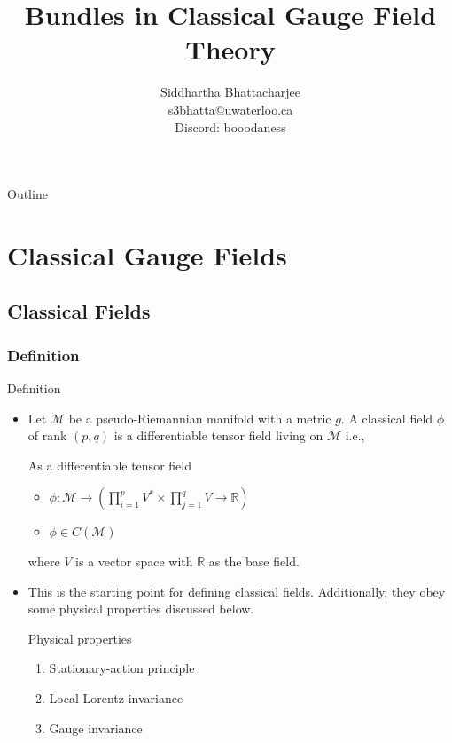 \documentclass[9pt,handout]{beamer}
\title[\textbf{Bundles in Classical Gauge Field Theory}]{Bundles in Classical Gauge Field Theory}
\author[\textbf{Sid (s3bhatta@uwaterloo.ca)}]
{Siddhartha Bhattacharjee \\
s3bhatta@uwaterloo.ca \\
Discord: booodaness}
\institute[\textbf{University of Waterloo, Mathematical Physics}]
{2A Mathematical Physics \\
University of Waterloo
}
\begin{document}
{
\beamertemplatenavigationsymbolsempty
\begin{frame}[plain]
\titlepage
\end{frame}
}

{
\beamertemplatenavigationsymbolsempty
{}
{}

\begin{frame}{Outline} 
\tableofcontents 
\end{frame} 
}
\addtocounter{framenumber}{-2}

\section{Classical Gauge Fields}

\subsection{Classical Fields}

\subsubsection{Definition}
\begin{frame}{Definition}
\begin{itemize}
\item Let $\mathcal{M}$ be a pseudo-Riemannian manifold with a metric $g$. A classical field $\phi$ of rank $\left( p, q \right)$ is a differentiable tensor field living on $\mathcal{M}$ i.e.,

\begin{block}{As a differentiable tensor field}
\begin{itemize}
\item $\displaystyle{\phi : \mathcal{M} \to \left( \prod_{i=1}^{p} V^* \times \prod_{j=1}^q V \to \mathbb{R} \right)}$
\item $\phi \in C \left( \mathcal{M} \right)$
\end{itemize}
\end{block}

where $V$ is a vector space with $\mathbb{R}$ as the base field.

\item This is the starting point for defining classical fields. Additionally, they obey some physical properties discussed below.

\begin{block}{Physical properties}
\begin{enumerate}
\item Stationary-action principle
\item Local Lorentz invariance
\item Gauge invariance
\end{enumerate}
\end{block}

\end{itemize}
\end{frame}
\end{document}
